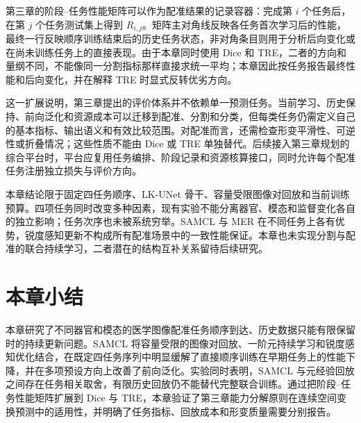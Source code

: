 第三章的阶段--任务性能矩阵可以作为配准结果的记录容器：完成第 $i$ 个任务后，在第 $j$ 个任务测试集上得到 $R_{i,j}$。矩阵主对角线反映各任务首次学习后的性能，最终一行反映顺序训练结束后的历史任务状态，非对角条目则用于分析后向变化或在尚未训练任务上的直接表现。由于本章同时使用 Dice 和 TRE，二者的方向和量纲不同，不能像同一分割指标那样直接求统一平均；本章因此按任务报告最终性能和后向变化，并在解释 TRE 时显式反转优劣方向。

这一扩展说明，第三章提出的评价体系并不依赖单一预测任务。当前学习、历史保持、前向泛化和资源成本可以迁移到配准、分割和分类，但每类任务仍需定义自己的基本指标、输出语义和有效比较范围。对配准而言，还需检查形变平滑性、可逆性或折叠情况；这些性质不能由 Dice 或 TRE 单独替代。后续接入第三章规划的综合平台时，平台应复用任务编排、阶段记录和资源核算接口，同时允许每个配准任务注册独立损失与评价方向。

本章结论限于固定四任务顺序、LK-UNet 骨干、容量受限图像对回放和当前训练预算。四项任务同时改变多种因素，现有实验不能分离器官、模态和监督变化各自的独立影响；任务次序也未被系统穷举。SAMCL 与 MER 在不同任务上各有优势，锐度感知更新不构成所有配准场景中的一致性能保证。本章也未实现分割与配准的联合持续学习，二者潜在的结构互补关系留待后续研究。

\section{本章小结}
\label{sec:registration-summary}

本章研究了不同器官和模态的医学图像配准任务顺序到达、历史数据只能有限保留时的持续更新问题。SAMCL 将容量受限的图像对回放、一阶元持续学习和锐度感知优化结合，在既定四任务序列中明显缓解了直接顺序训练在早期任务上的性能下降，并在多项预设方向上改善了前向泛化。实验同时表明，SAMCL 与元经验回放之间存在任务相关取舍，有限历史回放仍不能替代完整联合训练。通过把阶段--任务性能矩阵扩展到 Dice 与 TRE，本章验证了第三章能力分解原则在连续空间变换预测中的适用性，并明确了任务指标、回放成本和形变质量需要分别报告。
